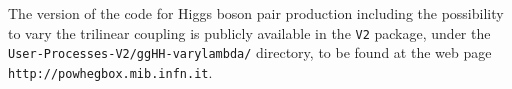 The \powheg{} version of the code for Higgs boson pair production
including the possibility to vary the trilinear coupling is
publicly available in the \powhegbox{} {\tt V2} package, under the
{\tt User-Processes-V2/ggHH-varylambda/} directory, to be found
at the web page {\tt http://powhegbox.mib.infn.it}.
